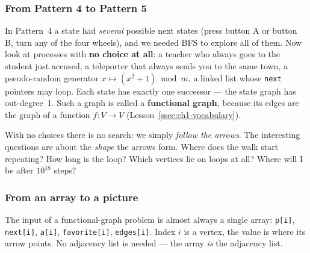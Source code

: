 \subsubsection*{From Pattern 4 to Pattern 5}

In Pattern~4 a state had \emph{several} possible next states (press button A or button B, turn any of the four wheels), and we needed BFS to explore all of them. Now look at processes with \textbf{no choice at all}: a teacher who always goes to the student just accused, a teleporter that always sends you to the same town, a pseudo-random generator $x \mapsto (x^2+1) \bmod m$, a linked list whose \texttt{next} pointers may loop. Each state has exactly one successor --- the state graph has out-degree~1. Such a graph is called a \textbf{functional graph}, because its edges are the graph of a function $f : V \to V$ (Lesson~\ref{ssec:ch1-vocabulary}).

With no choices there is no search: we simply \emph{follow the arrows}. The interesting questions are about the \emph{shape} the arrows form. Where does the walk start repeating? How long is the loop? Which vertices lie on loops at all? Where will I be after $10^{18}$ steps?

\subsubsection*{From an array to a picture}

The input of a functional-graph problem is almost always a single array: \texttt{p[i]}, \texttt{next[i]}, \texttt{a[i]}, \texttt{favorite[i]}, \texttt{edges[i]}. Index $i$ is a vertex, the value is where its arrow points. No adjacency list is needed --- the array \emph{is} the adjacency list.

\begin{diagrambox}
\end{diagrambox}

